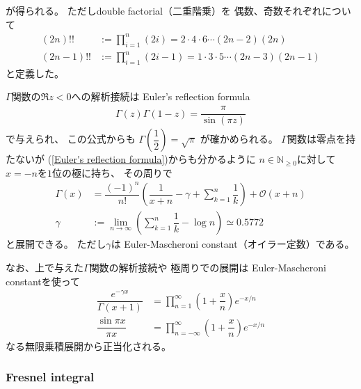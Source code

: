 が得られる。
ただしdouble factorial（二重階乗）を
偶数、奇数それぞれについて
\begin{subequations}
\begin{align}
    (2n)!!
    &:=
    \prod_{i=1}^n (2i)
    =2\cdot4\cdot6\cdots(2n-2)(2n)
\\
    (2n-1)!!
    &:=
    \prod_{i=1}^n (2i-1)
    =
    1\cdot3\cdot5\cdots(2n-3)(2n-1)
\end{align}
\end{subequations}
と定義した。

$\Gamma$関数の$\Re z < 0$への解析接続は
Euler's reflection formula
\begin{align}
    \Gamma(z) \Gamma(1-z)
    =
    \dfrac{\pi}{\sin(\pi z)}
\label{Euler's reflection formula}
\end{align}
で与えられ、
この公式からも
$\Gamma \left(\dfrac{1}{2}\right) = \sqrt{\pi}$
が確かめられる。
$\Gamma$関数は零点を持たないが
(\ref{Euler's reflection formula})からも分かるように
$n \in \mathbb{N}_{\ge0}$に対して
$x = - n$を$1$位の極に持ち、
その周りで
\begin{align}
    \Gamma(x)
    &=
    \dfrac{(-1)^n}{n!}
    \left(
        \dfrac{1}{x+n} - \gamma
        + \sum_{k=1}^n \dfrac{1}{k}
    \right)
    + \mathcal{O}(x+n)
\\
    \gamma
    &:=
    \lim_{n\to\infty}
    \left(
        \sum_{k=1}^n \dfrac{1}{k} 
        -
        \log n
    \right)
    \simeq 0.5772
\end{align}
と展開できる。
ただし$\gamma$は
Euler-Mascheroni constant（オイラー定数）である。

なお、上で与えた$\Gamma$関数の解析接続や
極周りでの展開は
Euler-Mascheroni constantを使って
\begin{subequations}
\begin{align}
    \dfrac{
        e^{- \gamma x}
    }{
        \Gamma(x+1)
    }
    &=
    \prod_{n=1}^\infty
    \left(
        1 + \dfrac{x}{n}
    \right)
    e^{- x / n}
\\
    \dfrac{\sin \pi x}{\pi x}
    &=
    \prod_{n = - \infty}^\infty
    \left(
        1 + \dfrac{x}{n}
    \right)
    e^{- x / n}
\end{align}
\end{subequations}
なる無限乗積展開から正当化される。

\subsubsection{Fresnel integral}


